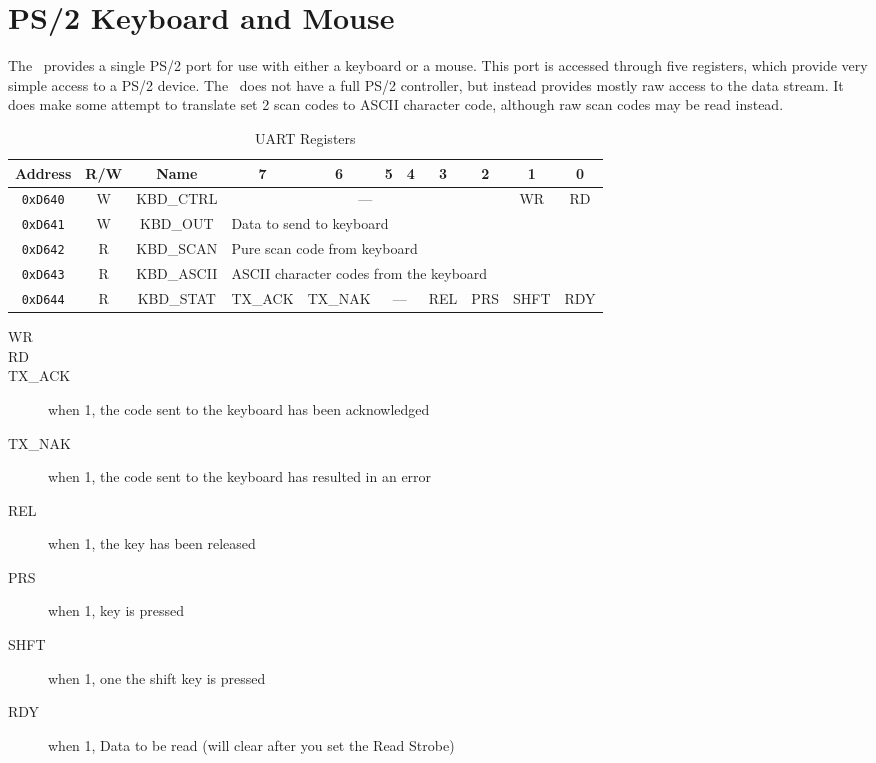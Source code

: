 \chapter{PS/2 Keyboard and Mouse}

The \jr\ provides a single PS/2 port for use with either a keyboard or a mouse. This port is accessed through five registers, which provide very simple access to a PS/2 device. The \jr\ does not have a full PS/2 controller, but instead provides mostly raw access to the data stream. It does make some attempt to translate set 2 scan codes to ASCII character code, although raw scan codes may be read instead.

\begin{table}[h]
    \begin{center}
        \begin{tabular}{|c|c|c|c|c|c|c|c|c|c|c|} \hline
            Address & R/W & Name & 7 & 6 & 5 & 4 & 3 & 2 & 1 & 0 \\\hline\hline
            \verb+0xD640+ & W & KBD\_CTRL & \multicolumn{6}{|c|}{---} & WR & RD \\\hline
            \verb+0xD641+ & W & KBD\_OUT & \multicolumn{8}{|l|}{Data to send to keyboard} \\ \hline
            \verb+0xD642+ & R & KBD\_SCAN & \multicolumn{8}{|l|}{Pure scan code from keyboard} \\ \hline
            \verb+0xD643+ & R & KBD\_ASCII & \multicolumn{8}{|l|}{ASCII character codes from the keyboard} \\ \hline
            \verb+0xD644+ & R & KBD\_STAT & TX\_ACK & TX\_NAK & \multicolumn{2}{|c|}{---} & REL & PRS & SHFT & RDY \\ \hline
        \end{tabular}
    \end{center}
    \caption{UART Registers}
    \label{tab:ps2_reg}
\end{table}

\begin{description}
    \item[WR]
    \item[RD]
    \item[TX\_ACK] when 1, the code sent to the keyboard has been acknowledged
    \item[TX\_NAK] when 1, the code sent to the keyboard has resulted in an error
    \item[REL] when 1, the key has been released
    \item[PRS] when 1, key is pressed
    \item[SHFT] when 1, one the shift key is pressed
    \item[RDY] when 1, Data to be read (will clear after you set the Read Strobe)   
\end{description}

